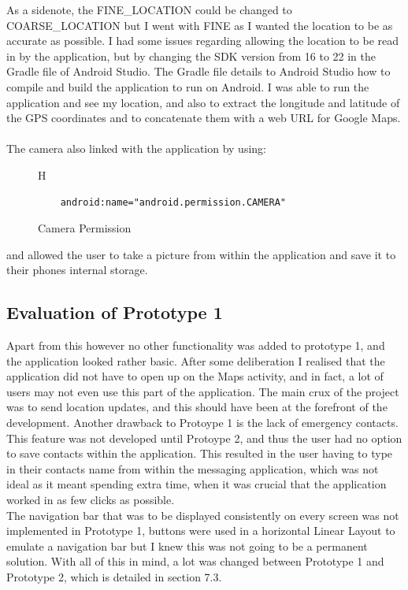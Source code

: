 \documentclass[a4paper]{report}
\begin{document}
As a sidenote, the FINE\_LOCATION could be changed to COARSE\_LOCATION but I went with FINE as I wanted the location to be as accurate as possible. I had some issues regarding allowing the location to be read in by the application, but by changing the SDK version from 16 to 22 in the Gradle file of Android Studio. The Gradle file details to Android Studio how to compile and build the application to run on Android. I was able to run the application and see my location, and also to extract the longitude and latitude of the GPS coordinates and to concatenate them with a web URL for Google Maps. \\\\
The camera also linked with the application by using: \\
\begin{figure}{H}
	\singlespacing
\begin{lstlisting}
	android:name="android.permission.CAMERA"
\end{lstlisting}
\caption{Camera Permission} 
\label{fig:CameraPer}
\end{figure}
and allowed the user to take a picture from within the application and save it to their phones internal storage. \\

\subsection{Evaluation of Prototype 1}
\label{sec:EvalPrototype1}
Apart from this however no other functionality was added to prototype 1, and the application looked rather basic. After some deliberation I realised that the application did not have to open up on the Maps activity, and in fact, a lot of users may not even use this part of the application. The main crux of the project was to send location updates, and this should have been at the forefront of the development. Another drawback to Protoype 1 is the lack of emergency contacts. This feature was not developed until Protoype 2, and thus the user had no option to save contacts within the application. This resulted in the user having to type in their contacts name from within the messaging application, which was not ideal as it meant spending extra time, when it was crucial that the application worked in as few clicks as possible. \\ The navigation bar that was to be displayed consistently on every screen was not implemented in Prototype 1, buttons were used in a horizontal Linear Layout to emulate a navigation bar but I knew this was not going to be a permanent solution.
With all of this in mind, a lot was changed between Prototype 1 and Prototype 2, which is detailed in section 7.3.
\end{document}
